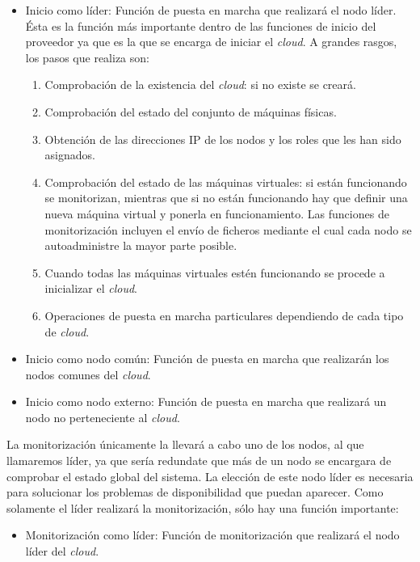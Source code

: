 \begin{itemize}
\item Inicio como líder: Función de puesta en marcha que realizará el nodo líder. Ésta es la función más importante dentro de las funciones de inicio del proveedor ya que es la que se encarga de iniciar el \emph{cloud}. A grandes rasgos, los pasos que realiza son:

   \begin{enumerate}
   \item Comprobación de la existencia del \emph{cloud}: si no existe se creará.
   \item Comprobación del estado del conjunto de máquinas físicas.
   \item Obtención de las direcciones IP de los nodos y los roles que les han sido asignados.
   \item Comprobación del estado de las máquinas virtuales: si están funcionando se monitorizan, mientras que si no están funcionando hay que definir una nueva máquina virtual y ponerla en funcionamiento. Las funciones de monitorización incluyen el envío de ficheros mediante el cual cada nodo se autoadministre la mayor parte posible.
   \item Cuando todas las máquinas virtuales estén funcionando se procede a inicializar el \emph{cloud}.
   \item Operaciones de puesta en marcha particulares dependiendo de cada tipo de \emph{cloud}.
   \end{enumerate}

\item Inicio como nodo común: Función de puesta en marcha que realizarán los nodos comunes del \emph{cloud}.
\item Inicio como nodo externo: Función de puesta en marcha que realizará un nodo no perteneciente al \emph{cloud}.
\end{itemize}

La monitorización únicamente la llevará a cabo uno de los nodos, al que llamaremos líder, ya que sería redundate que más de un nodo se encargara de comprobar el estado global del sistema. La elección de este nodo líder es necesaria para solucionar los problemas de disponibilidad que puedan aparecer. Como solamente el líder realizará la monitorización, sólo hay una función importante:

\begin{itemize}
\item Monitorización como líder: Función de monitorización que realizará el nodo líder del \emph{cloud}.
\end{itemize}

